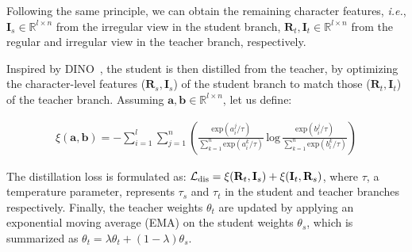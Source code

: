 \documentclass[10pt,twocolumn,letterpaper]{article}
\begin{document}
Following the same principle, we can obtain the remaining character features, \emph{i.e.}, $\mathbf{I}_{s} \in \mathbb{R}^{l \times n}$ from the irregular view in the student branch, $\mathbf{R}_{t}, \mathbf{I}_{t} \in \mathbb{R}^{l \times n}$ from the regular and irregular view in the teacher branch, respectively.

Inspired by DINO~\cite{Dino}, the student is then distilled from the teacher, by optimizing the character-level features ($\mathbf{R}_{s}, \mathbf{I}_{s}$) of the student branch to match those ($\mathbf{R}_{t}, \mathbf{I}_{t}$) of the teacher branch. Assuming $\mathbf{a},\mathbf{b} \in \mathbb{R}^{l \times n}$, let us define:
\begin{small}
  {\setlength\abovedisplayskip{0cm}
  \setlength\belowdisplayskip{0cm}
 \begin{equation}
    \begin{aligned}
\xi(\mathbf{a},\mathbf{b}) = -\sum_{i=1}^{l}\sum_{j=1}^{n}(\frac{\mathrm{exp}(a_{i}^{j}/\tau)}{\sum_{k=1}^{n}\mathrm{exp}(a_{i}^{k}/\tau)}\,\mathrm{log}\,\frac{\mathrm{exp}(b_{i}^{j}/\tau)}{\sum_{k=1}^{n}\mathrm{exp}(b_{i}^{k}/\tau)})
    \end{aligned}
    \nonumber
\end{equation}}
\end{small}

\noindent The distillation loss is formulated as: $\mathcal{L}_{\rm dis} = \xi(\mathbf{R}_{t}, \mathbf{I}_{s}) + \xi(\mathbf{I}_{t}, \mathbf{R}_{s})$, where $\tau$, a temperature parameter, represents $\tau_{s}$ and $\tau_{t}$ in the student and teacher branches respectively.
Finally, the teacher weights $\theta_{t}$ are updated by applying an exponential moving average (EMA) on the student weights $\theta_{s}$, which is summarized as $\theta_{t} = \lambda \theta_{t} + (1-\lambda) \theta_{s}$.
\end{document}
